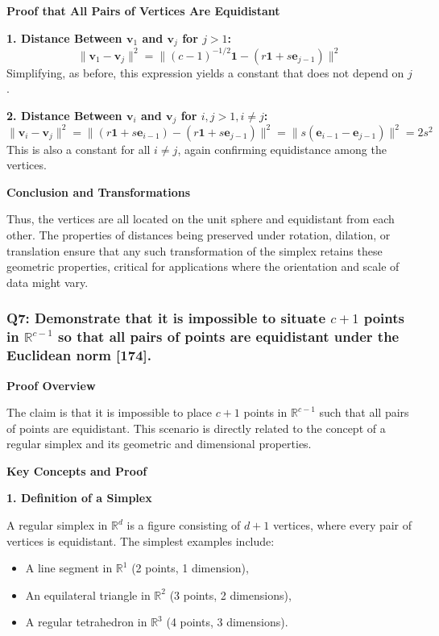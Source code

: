 \documentclass[8pt]{article}
\begin{document}
\textbf{Proof that All Pairs of Vertices Are Equidistant}

\textbf{1. Distance Between \( \mathbf{v}_1 \) and \( \mathbf{v}_j \) for \( j > 1 \):}
   \[
   \|\mathbf{v}_1 - \mathbf{v}_j\|^2 = \| (c - 1)^{-1/2} \mathbf{1} - (r \mathbf{1} + s \mathbf{e}_{j-1}) \|^2
   \]
   Simplifying, as before, this expression yields a constant that does not depend on \(j\).

\textbf{2. Distance Between \( \mathbf{v}_i \) and \( \mathbf{v}_j \) for \( i, j > 1, i \neq j \):}
   \[
   \|\mathbf{v}_i - \mathbf{v}_j\|^2 = \|(r \mathbf{1} + s \mathbf{e}_{i-1}) - (r \mathbf{1} + s \mathbf{e}_{j-1})\|^2 = \|s (\mathbf{e}_{i-1} - \mathbf{e}_{j-1})\|^2 = 2s^2
   \]
   This is also a constant for all \(i \neq j\), again confirming equidistance among the vertices.

\textbf{Conclusion and Transformations}

Thus, the vertices are all located on the unit sphere and equidistant from each other. The properties of distances being preserved under rotation, dilation, or translation ensure that any such transformation of the simplex retains these geometric properties, critical for applications where the orientation and scale of data might vary.

\subsubsection*{Q7: Demonstrate that it is impossible to situate \(c + 1\) points in \(\mathbb{R}^{c-1}\) so that all pairs of points are equidistant under the Euclidean norm [174].}

\textbf{Proof Overview}

The claim is that it is impossible to place \(c + 1\) points in \(\mathbb{R}^{c-1}\) such that all pairs of points are equidistant. This scenario is directly related to the concept of a regular simplex and its geometric and dimensional properties.

\textbf{Key Concepts and Proof}

\textbf{1. Definition of a Simplex}

A regular simplex in \( \mathbb{R}^d \) is a figure consisting of \( d + 1 \) vertices, where every pair of vertices is equidistant. The simplest examples include:
\begin{itemize}
    \item A line segment in \( \mathbb{R}^1 \) (2 points, 1 dimension),
    \item An equilateral triangle in \( \mathbb{R}^2 \) (3 points, 2 dimensions),
    \item A regular tetrahedron in \( \mathbb{R}^3 \) (4 points, 3 dimensions).
\end{itemize}
\end{document}
